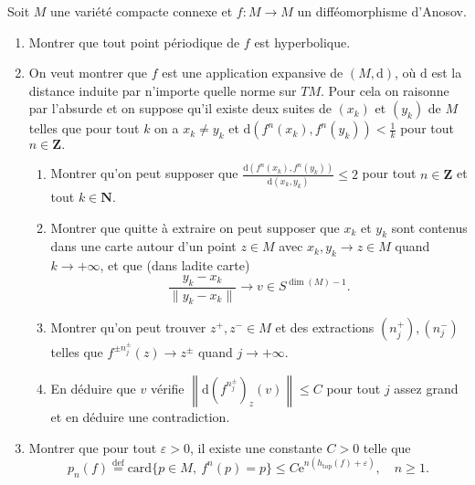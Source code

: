 \documentclass[a4paper,10pt,openany]{article}
\theoremstyle{plain}
\theoremstyle{definition}
\newcommand{\e}{\mathrm{e}}
\newcommand{\dd}{\mathrm{d}}
\newcommand{\Z}{\mathbf{Z}}
\newcommand{\N}{\mathbf{N}}
\newcommand{\htop}{h_\mathrm{top}}
\begin{document}
 \vspace{1.5mm} 

\noindent Soit $M$ une vari\'et\'e compacte connexe
 et $f : M \to M$ un diff\'eomorphisme d'Anosov. 

\begin{enumerate}
\item Montrer que tout point p\'eriodique de $f$ est hyperbolique.
\item On veut montrer que $f$ est une application expansive de $(M,\dd)$, o\`u $\dd$ est la distance induite par n'importe quelle norme sur $TM$. Pour cela on raisonne par l'absurde et on suppose qu'il existe deux suites de $(x_k)$ et $(y_k)$ de $M$ telles que pour tout $k$ on a $x_k \neq y_k$ et
$
\dd(f^n(x_k), f^n(y_k)) < \frac{1}{k}
$
pour tout $n \in \Z.$
\begin{enumerate}
\item Montrer qu'on peut supposer que 
$
\displaystyle{\frac{\dd(f^n(x_k), f^n(y_k))}{\dd(x_k, y_k)}} \leqslant 2$ pour tout $n \in \Z$ et tout $k \in \N$.

\item Montrer que quitte \`a extraire on peut supposer que $x_k$ et $y_k$ sont contenus dans une carte autour d'un point $z \in M$ avec $x_k, y_k \to z \in M$ quand $k \to +\infty$, et que (dans ladite carte)
$$
\frac{y_k - x_k}{\|y_k - x_k\|} \to v \in S^{\dim(M)-1}.
$$
\item Montrer qu'on peut trouver $z^+,z^- \in M$ et des extractions $(n_j^+), (n_j^-)$ telles que $f^{\pm n_j^{\pm}}(z) \to z^{\pm}$ quand $j \to +\infty$.
\item En d\'eduire que $v$ v\'erifie $\left\|\dd \left(f^{n_j^\pm}\right)_z(v)\right\| \leqslant C$ pour tout $j$ assez grand et en d\'eduire une contradiction.
\end{enumerate}
\item Montrer que pour tout $\varepsilon > 0$, il existe une constante $C>0$ telle que 
$$
p_n(f) \overset{\mathrm{def}}{=} \mathrm{card}\bigl\{p \in M,~f^n(p) = p\bigr\} \leq C \e^{n(\htop(f) + \varepsilon)}, \quad n \geq 1.
$$
\end{enumerate}

\vspace{0.6cm}

 \vspace{1.5mm} 
\end{document}
